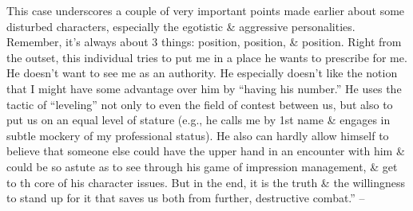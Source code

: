 \documentclass{article}
\numberwithin{equation}{section}
\begin{document}
This case underscores a couple of very important points made earlier about some disturbed characters, especially the egotistic \& aggressive personalities. Remember, it's always about 3 things: position, position, \& position. Right from the outset, this individual tries to put me in a place he wants to prescribe for me. He doesn't want to see me as an authority. He especially doesn't like the notion that I might have some advantage over him by ``having his number.'' He uses the tactic of ``leveling'' not only to even the field of contest between us, but also to put us on an equal level of stature (e.g., he calls me by 1st name \& engages in subtle mockery of my professional status). He also can hardly allow himself to believe that someone else could have the upper hand in an encounter with him \& could be so astute as to see through his game of impression management, \& get to th core of his character issues. But in the end, it is the truth \& the willingness to stand up for it that saves us both from further, destructive combat.'' -- \cite[pp. 226--230]{Simon2011}
\end{document}
